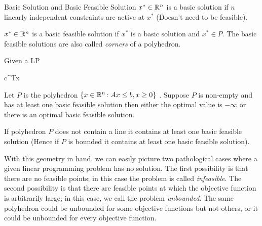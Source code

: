 \begin{Definition}{Basic Solution and Basic Feasible Solution}{}
	$x^*\in \mathbb{R}^n$ is a basic solution if $n$ linearly independent constraints are active at $x^*$ (Doesn't need to  be feasible).\parinn
	
	$x^*\in\mathbb{R}^n$ is a basic feasible solution if $x^*$ is a basic solution and $x^*\in P$. The basic feasible solutions are also called \textit{corners} of a polyhedron.
\end{Definition}
\begin{Theorem}{}{}
	Given a LP 	\begin{mini*}
		{}{c^Tx}{}{}
	\end{mini*}Let $P$ is the polyhedron $\{x\in\mathbb{R}^n\colon Ax\leq b, x\geq0\}$ . Suppose $P$ is non-empty and has at least one basic feasible solution  then either the optimal value is $-\infty$ or there is an optimal basic feasible solution. 
\end{Theorem}

\begin{Theorem}{}{}
	If polyhedron $P$ does not contain a line it contains at least one basic feasible solution (Hence if $P$ is bounded it contains at least one basic feasible solution).
\end{Theorem}

With this geometry in hand, we can easily picture two pathological cases where a given linear programming problem has no solution. The first possibility is that there are no feasible points; in this case the problem is called \textit{infeasible}. The second possibility is that there are feasible points at which the objective function is arbitrarily large; in this case, we call the problem \textit{unbounded}. The same polyhedron could be unbounded for some objective functions but not others, or it could be unbounded for every objective function.

